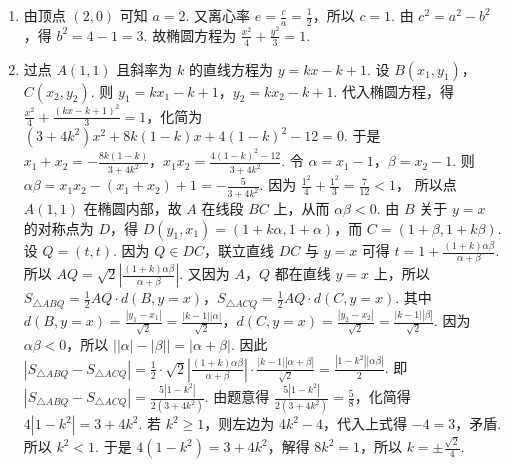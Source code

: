 \documentclass[UTF8,a4paper,oneside,11pt]{ctexbook}
\begin{document}
\begin{solution}
\begin{enumerate}
\item 由顶点 \( \left( 2,0 \right) \) 可知 \( a=2 \). 又离心率 \( e=\frac{c}{a}=\frac{1}{2} \)，所以 \( c=1 \). 由 \( c^2=a^2-b^2 \)，得 \( b^2=4-1=3 \).
故椭圆方程为 \( \frac{x^2}{4}+\frac{y^2}{3}=1 \).

\item 过点 \( A\left( 1,1 \right) \) 且斜率为 \( k \) 的直线方程为 \( y=kx-k+1 \).
设 \( B\left( x_1,y_1 \right) \)，\( C\left( x_2,y_2 \right) \). 则 \( y_1=kx_1-k+1 \)，\( y_2=kx_2-k+1 \).
代入椭圆方程，得 \( \frac{x^2}{4}+\frac{\left( kx-k+1 \right)^2}{3}=1 \)，化简为 \( \left( 3+4k^2 \right)x^2+8k\left( 1-k \right)x+4\left( 1-k \right)^2-12=0 \). 于是 \( x_1+x_2=-\frac{8k\left( 1-k \right)}{3+4k^2} \)，\( x_1x_2=\frac{4\left( 1-k \right)^2-12}{3+4k^2} \).
令 \( \alpha=x_1-1 \)，\( \beta=x_2-1 \).
则 \( \alpha\beta=x_1x_2-\left( x_1+x_2 \right)+1=-\frac{5}{3+4k^2} \).
因为 \( \frac{1^2}{4}+\frac{1^2}{3}=\frac{7}{12}<1 \)，
所以点 \( A\left( 1,1 \right) \) 在椭圆内部，故 \(A\) 在线段 \(BC\) 上，从而 \( \alpha\beta<0 \).
由 \(B\) 关于 \( y=x \) 的对称点为 \(D\)，得 \( D\left( y_1,x_1 \right)=\left( 1+k\alpha,1+\alpha \right) \)，而 \( C=\left( 1+\beta,1+k\beta \right) \).
设 \( Q=\left( t,t \right) \). 因为 \( Q\in DC \)，联立直线 \(DC\) 与 \( y=x \) 可得 \( t=1+\frac{\left( 1+k \right)\alpha\beta}{\alpha+\beta} \).
所以 \( AQ=\sqrt{2}\left| \frac{\left( 1+k \right)\alpha\beta}{\alpha+\beta} \right| \).
又因为 \(A\)，\(Q\) 都在直线 \( y=x \) 上，所以 \( S_{\triangle ABQ}=\frac{1}{2}AQ\cdot d\left( B,y=x \right) \)，\( S_{\triangle ACQ}=\frac{1}{2}AQ\cdot d\left( C,y=x \right) \). 其中 \( d\left( B,y=x \right)=\frac{\left| y_1-x_1 \right|}{\sqrt{2}}=\frac{\left| k-1 \right|\left| \alpha \right|}{\sqrt{2}} \)，\( d\left( C,y=x \right)=\frac{\left| y_2-x_2 \right|}{\sqrt{2}}=\frac{\left| k-1 \right|\left| \beta \right|}{\sqrt{2}} \).
因为 \( \alpha\beta<0 \)，所以 \( \left| \left| \alpha \right|-\left| \beta \right| \right|=\left| \alpha+\beta \right| \). 因此 \( \left| S_{\triangle ABQ}-S_{\triangle ACQ} \right|=\frac{1}{2}\cdot \sqrt{2}\left| \frac{\left( 1+k \right)\alpha\beta}{\alpha+\beta} \right|\cdot \frac{\left| k-1 \right|\left| \alpha+\beta \right|}{\sqrt{2}}=\frac{\left| 1-k^2 \right|\left| \alpha\beta \right|}{2} \).
即 \( \left| S_{\triangle ABQ}-S_{\triangle ACQ} \right|=\frac{5\left| 1-k^2 \right|}{2\left( 3+4k^2 \right)} \). 由题意得 \( \frac{5\left| 1-k^2 \right|}{2\left( 3+4k^2 \right)}=\frac{5}{8} \)，化简得 \( 4\left| 1-k^2 \right|=3+4k^2 \).
若 \( k^2\ge 1 \)，则左边为 \( 4k^2-4 \)，代入上式得 \( -4=3 \)，矛盾. 所以 \( k^2<1 \). 于是 \( 4\left( 1-k^2 \right)=3+4k^2 \)，解得 \( 8k^2=1 \)，所以 \( k=\pm \frac{\sqrt{2}}{4} \).
\end{enumerate}
\end{solution}
\end{document}
